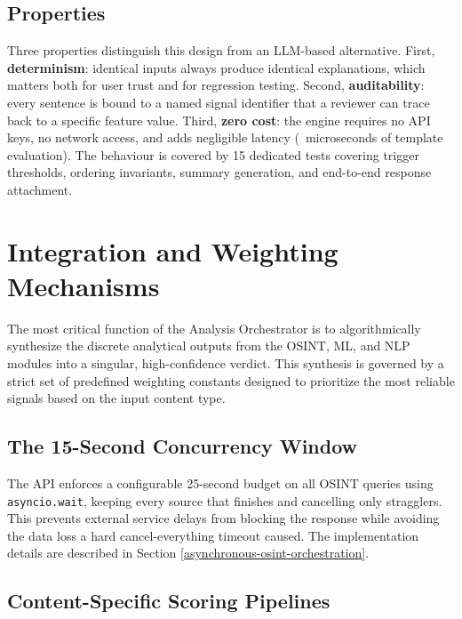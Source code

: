 \subsection{Properties}

Three properties distinguish this design from an LLM-based alternative.
First, \textbf{determinism}: identical inputs always produce identical
explanations, which matters both for user trust and for regression
testing. Second, \textbf{auditability}: every sentence is bound to a named
signal identifier that a reviewer can trace back to a specific feature
value. Third, \textbf{zero cost}: the engine requires no API keys, no
network access, and adds negligible latency (~microseconds of template
evaluation). The behaviour is covered by 15 dedicated tests covering
trigger thresholds, ordering invariants, summary generation, and end-to-end
response attachment.

\section{Integration and Weighting
Mechanisms}\label{integration-and-weighting-mechanisms}

The most critical function of the Analysis Orchestrator is to
algorithmically synthesize the discrete analytical outputs from the
OSINT, ML, and NLP modules into a singular, high-confidence verdict.
This synthesis is governed by a strict set of predefined weighting
constants designed to prioritize the most reliable signals based on the
input content type.

\subsection{The 15-Second Concurrency
Window}\label{the-15-second-concurrency-window}

The API enforces a configurable 25-second budget on all OSINT queries using \texttt{asyncio.wait}, keeping every source that finishes and cancelling only stragglers. This prevents external service delays from blocking the response while avoiding the data loss a hard cancel-everything timeout caused. The implementation details are described in Section \ref{asynchronous-osint-orchestration}.

\subsection{Content-Specific Scoring
Pipelines}\label{content-specific-scoring-pipelines}


